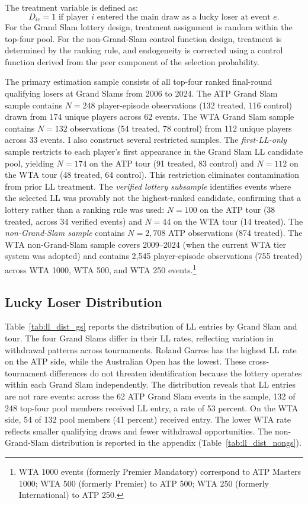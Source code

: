 The treatment variable is defined as:
\[
D_{ie} = 1 \text{ if player } i \text{ entered the main draw as a lucky loser at event } e.
\]
For the Grand Slam lottery design, treatment assignment is random within the top-four pool. For the non-Grand-Slam control function design, treatment is determined by the ranking rule, and endogeneity is corrected using a control function derived from the peer component of the selection probability.

The primary estimation sample consists of all top-four ranked final-round qualifying losers at Grand Slams from 2006 to 2024. The ATP Grand Slam sample contains $N = 248$ player-episode observations (132 treated, 116 control) drawn from 174 unique players across 62 events. The WTA Grand Slam sample contains $N = 132$ observations (54 treated, 78 control) from 112 unique players across 33 events. I also construct several restricted samples. The \textit{first-LL-only} sample restricts to each player's first appearance in the Grand Slam LL candidate pool, yielding $N = 174$ on the ATP tour (91 treated, 83 control) and $N = 112$ on the WTA tour (48 treated, 64 control). This restriction eliminates contamination from prior LL treatment. The \textit{verified lottery subsample} identifies events where the selected LL was provably not the highest-ranked candidate, confirming that a lottery rather than a ranking rule was used: $N = 100$ on the ATP tour (38 treated, across 34 verified events) and $N = 44$ on the WTA tour (14 treated). The \textit{non-Grand-Slam sample} contains $N = 2{,}708$ ATP observations (874 treated). The WTA non-Grand-Slam sample covers 2009--2024 (when the current WTA tier system was adopted) and contains 2,545 player-episode observations (755 treated) across WTA 1000, WTA 500, and WTA 250 events.\footnote{WTA 1000 events (formerly Premier Mandatory) correspond to ATP Masters 1000; WTA 500 (formerly Premier) to ATP 500; WTA 250 (formerly International) to ATP 250.}

\subsection{Lucky Loser Distribution}
\label{sec:data_distribution}

Table~\ref{tab:ll_dist_gs} reports the distribution of LL entries by Grand Slam and tour. The four Grand Slams differ in their LL rates, reflecting variation in withdrawal patterns across tournaments. Roland Garros has the highest LL rate on the ATP side, while the Australian Open has the lowest. These cross-tournament differences do not threaten identification because the lottery operates within each Grand Slam independently. The distribution reveals that LL entries are not rare events: across the 62 ATP Grand Slam events in the sample, 132 of 248 top-four pool members received LL entry, a rate of 53 percent. On the WTA side, 54 of 132 pool members (41 percent) received entry. The lower WTA rate reflects smaller qualifying draws and fewer withdrawal opportunities. The non-Grand-Slam distribution is reported in the appendix (Table~\ref{tab:ll_dist_nongs}).

